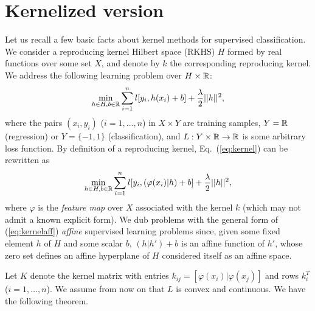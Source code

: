 \documentclass[12pt,letterpaper]{article}
\begin{document}
\section{Kernelized version}
Let us recall a few basic facts about kernel methods for supervised
classification. We consider a reproducing kernel Hilbert space (RKHS)
$H$ formed by real functions over some set
$X$, and denote by $k$ the corresponding reproducing kernel.  We
address the following learning problem over $H\times\mathbb{R}$:
\begin{equation}
\min_{h\in H,b\in\mathbb{R}}
\sum_{i=1}^n l[y_i,h(x_i)+b] + \frac{\lambda}{2}||h||^2,
\label{eq:kernel}
\end{equation}  
where the pairs $(x_i,y_i)$ ($i=1,\ldots,n$) in $X\times Y$ are
training samples, $Y=\mathbb{R}$ (regression) or $Y=\{-1,1\}$
(classification), and $L: Y\times \mathbb{R}\rightarrow\mathbb{R}$ is some arbitrary
loss function. By definition of a reproducing kernel,
Eq.~(\ref{eq:kernel}) can be rewritten as
\begin{equation}
\min_{h\in H,b\in\mathbb{R}}
\sum_{i=1}^n l[y_i,( \varphi(x_i)|h)+b] +
\frac{\lambda}{2}||h||^2,
\label{eq:kernelaff}
\end{equation} 
where $\varphi$ is the {\em feature map} over $X$ associated with the
kernel $k$ (which may not admit a known explicit form). We dub
problems with the general form of (\ref{eq:kernelaff}) {\em affine}
supervised learning problems since, given some fixed element $h$ of
$H$ and some scalar $b$, $(h|h')+b$ is an affine function of $h'$,
whose zero set defines an affine hyperplane of $H$ considered itself
as an affine space.


Let $K$ denote the kernel matrix with entries $k_{ij}=[\varphi(x_i)|
\varphi(x_j)]$ and rows $k_i^T$ ($i=1,\ldots,n$).  We assume from now
on that $L$ is convex and continuous. We have the following theorem.
\end{document}
